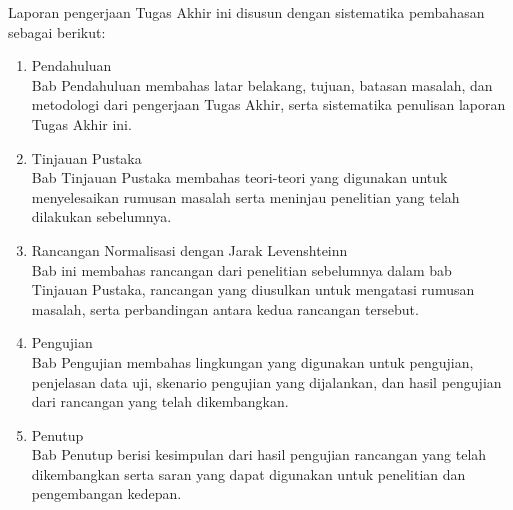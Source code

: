 Laporan pengerjaan Tugas Akhir ini disusun dengan sistematika pembahasan sebagai berikut:

\begin{enumerate}[label=Bab \arabic*,itemindent=*]
	\item Pendahuluan\\
	Bab Pendahuluan membahas latar belakang, tujuan, batasan masalah, dan metodologi dari pengerjaan Tugas Akhir, serta sistematika penulisan laporan Tugas Akhir ini.
	\item Tinjauan Pustaka\\
	Bab Tinjauan Pustaka membahas teori-teori yang digunakan untuk menyelesaikan rumusan masalah serta meninjau penelitian yang telah dilakukan sebelumnya.
	\item Rancangan Normalisasi dengan Jarak Levenshteinn\\
	Bab ini membahas rancangan dari penelitian sebelumnya dalam bab Tinjauan Pustaka, rancangan yang diusulkan untuk mengatasi rumusan masalah, serta perbandingan antara kedua rancangan tersebut.
	\item Pengujian\\
	Bab Pengujian membahas lingkungan yang digunakan untuk pengujian, penjelasan data uji, skenario pengujian yang dijalankan, dan hasil pengujian dari rancangan yang telah dikembangkan.
	\item Penutup\\
	Bab Penutup berisi kesimpulan dari hasil pengujian rancangan yang telah dikembangkan serta saran yang dapat digunakan untuk penelitian dan pengembangan kedepan.
\end{enumerate}
